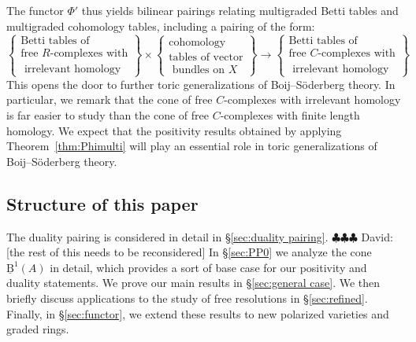 \documentclass[12pt]{amsart}
\theoremstyle{definition}
\theoremstyle{remark}
\newcommand{\BBQ}{\underline{\mathrm{B}}}
\newcommand{\david}[1]{{\color{red} \sf $\clubsuit\clubsuit\clubsuit$ David: [#1]}}
\begin{document}
The functor $\Phi'$ thus yields bilinear pairings relating multigraded Betti tables and multigraded cohomology tables, including a pairing of the form:
\begin{equation*}%
\label{eqn:multipairing}
%
\left\{\begin{matrix}
\text{Betti tables of} \\ \text{free $R$-complexes with}\\
\text{  irrelevant homology}\end{matrix}\right\}
%
\times 
%
\left\{\begin{matrix}
\text{cohomology }\\
\text{tables of vector}\\
\text{ bundles on } X
\end{matrix}\right\}
%
\longrightarrow
\left\{\begin{matrix}
\text{Betti tables of} \\ \text{free $C$-complexes with}\\
\text{  irrelevant homology}
\end{matrix}\right\}
\end{equation*}
This opens the door to further toric generalizations of Boij--S\"oderberg theory.  In particular, we remark that the cone of free $C$-complexes with irrelevant homology is far easier to study than the cone of free $C$-complexes with finite length homology.  We expect that the positivity results obtained by applying Theorem~\ref{thm:Phimulti} will play an essential role in toric generalizations of Boij--S\"oderberg theory.



\subsection*{Structure of this paper} The duality pairing is considered in detail in \S\ref{sec:duality pairing}. \david{the rest of this needs to be reconsidered} In \S\ref{sec:PP0} we analyze the cone $\BBQ^1(A)$ in detail, which provides a sort of base case for our positivity and duality statements.  We prove our main results in \S\ref{sec:general case}.  We then briefly discuss applications to the study of free resolutions in \S\ref{sec:refined}.  Finally, in \S\ref{sec:functor}, we extend these results to new polarized varieties and graded rings.
\end{document}
